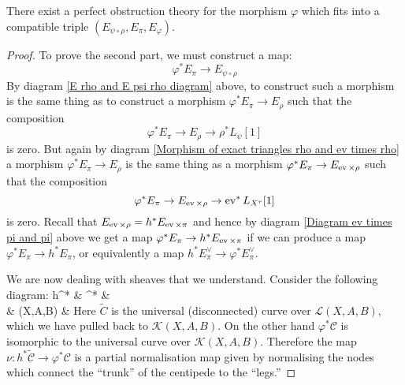 \begin{lemma} \label{Second part of pullback lemma} There exist a perfect  obstruction theory for the morphism $\varphi$ which fits into a compatible triple $(E_{\psi \circ \rho}, E_\pi, E_\varphi)$.\end{lemma}

\begin{proof}
To prove the second part, we must construct a map:
\begin{equation*} \varphi^* E_\pi \to E_{\psi \circ \rho} \end{equation*}
By diagram \eqref{E rho and E psi rho diagram} above, to construct such a morphism is the same thing as to construct a morphism $\varphi^* E_{\pi} \to E_\rho$ such that the composition
\begin{equation*} \varphi^* E_\pi \to E_\rho \to \rho^* L_\psi[1] \end{equation*}
is zero. But again by diagram \eqref{Morphism of exact triangles rho and ev times rho} a morphism $\varphi^* E_\pi \to E_\rho$ is the same thing as a morphism $\varphi^* E_\pi \rightarrow E_{\operatorname{ev} \times \rho}$ such that the composition
\begin{equation*} \varphi^* E_\pi \rightarrow E_{\operatorname{ev} \times \rho} \rightarrow \operatorname{ev}^*L_{X^r}[1] \end{equation*}
is zero. Recall that $E_{\operatorname{ev} \times \rho} = h^* E_{\operatorname{ev} \times \pi}$ and hence by diagram \eqref{Diagram ev times pi and pi} above we get a map $\varphi^* E_\pi \rightarrow h^* E_{\operatorname{ev} \times \pi}$ if we can produce a map $\varphi^* E_\pi \to h^* E_\pi$, or equivalently a map $h^* E_\pi^\vee \to \varphi^*E_\pi^\vee$.

We are now dealing with sheaves that we understand. Consider the following diagram:
\bcd
h^*  \ar[r,"\nu"]  & \varphi^*  \ar[r,"\alpha"] \ar[d,"\rho"]  &  \ar[d,"\pi"] \\
& (X,A,B) \ar[r,"\varphi"] & 
\ecd
Here $\tilde{C}$ is the universal (disconnected) curve over $\mathcal{L}(X,A,B)$, which we have pulled back to $\mathcal{K}(X,A,B)$. On the other hand $\varphi^* \mathcal{C}$ is isomorphic to the universal curve over $\mathcal{K}(X,A,B)$. Therefore the map $\nu : h^* \tilde{\mathcal{C}} \to \varphi^* \mathcal{C}$ is a partial normalisation map given by normalising the nodes which connect the ``trunk'' of the centipede to the ``legs.''


\end{proof}
